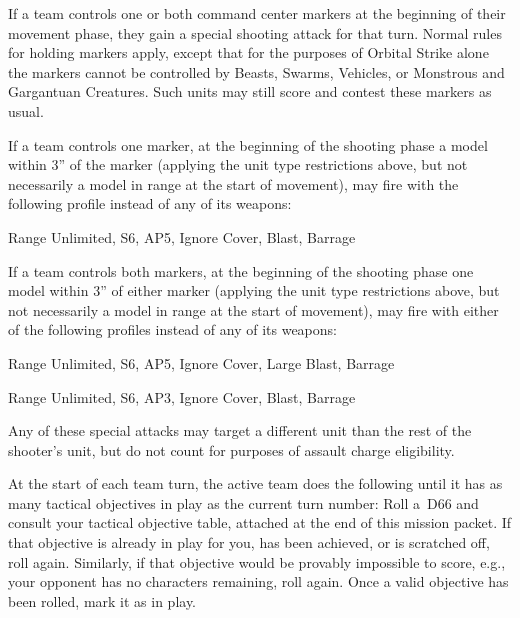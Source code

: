 \begin{missionrules}

\nightfighting

%
If a team controls one or both command center markers at the beginning
of their movement phase, they gain a special shooting attack for that
turn.  Normal rules for holding markers apply, except that for the
purposes of Orbital Strike alone the markers cannot be controlled by
Beasts, Swarms, Vehicles, or Monstrous and Gargantuan Creatures.  Such
units may still score and contest these markers as usual.

\bigskip%
If a team controls one marker, at the beginning of the shooting phase
a model within 3'' of the marker (applying the unit type restrictions
above, but not necessarily a model in range at the start of movement),
may fire with the following profile instead of any of its weapons:
\begin{squishitemize}
\item Range Unlimited, S6, AP5, Ignore Cover, Blast, Barrage
\end{squishitemize}

\bigskip%
If a team controls both markers, at the beginning of the shooting
phase one model within 3'' of either marker (applying the unit type
restrictions above, but not necessarily a model in range at the start
of movement), may fire with either of the following profiles instead
of any of its weapons:
\begin{squishitemize}
\item Range Unlimited, S6, AP5, Ignore Cover, Large Blast, Barrage
\item Range Unlimited, S6, AP3, Ignore Cover, Blast, Barrage
\end{squishitemize}

\bigskip%
Any of these special attacks may target a different unit than the rest
of the shooter's unit, but do not count for purposes of assault charge
eligibility.

%
At the start of each team turn, the active team does the following
until it has as many tactical objectives in play as the current turn
number: Roll a~D66 and consult your tactical objective table, attached
at the end of this mission packet.  If that objective is already in
play for you, has been achieved, or is scratched off, roll again.
Similarly, if that objective would be provably impossible to score,
e.g., your opponent has no characters remaining, roll again.  Once a
valid objective has been rolled, mark it as in play.


\end{missionrules}
